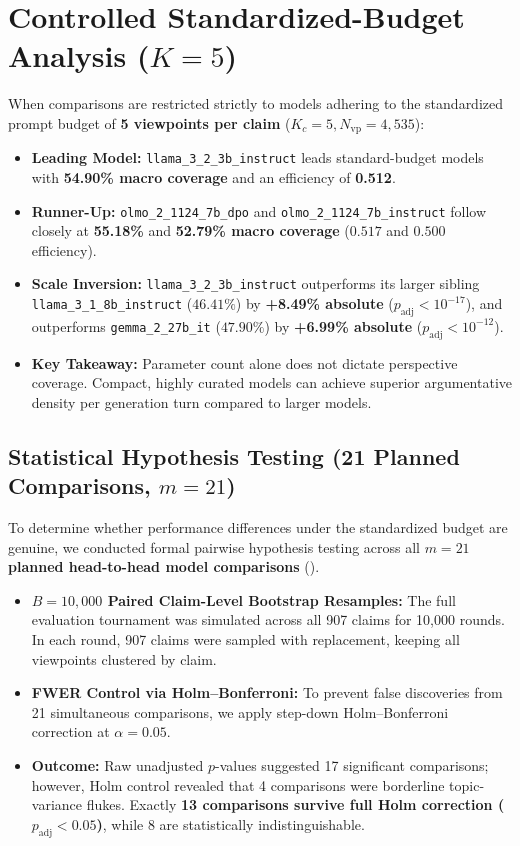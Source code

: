 \documentclass[11pt,a4paper]{article}
\begin{document}
\section{Controlled Standardized-Budget Analysis ($K = 5$)}
\label{sec:controlled_budget}

When comparisons are restricted strictly to models adhering to the standardized prompt budget of \textbf{5 viewpoints per claim} ($K_c = 5, N_{\text{vp}} = 4,535$):
\begin{itemize}[leftmargin=*,itemsep=1pt]
    \item \textbf{Leading Model:} \texttt{llama\_3\_2\_3b\_instruct} leads standard-budget models with \textbf{54.90\% macro coverage} and an efficiency of \textbf{0.512}.
    \item \textbf{Runner-Up:} \texttt{olmo\_2\_1124\_7b\_dpo} and \texttt{olmo\_2\_1124\_7b\_instruct} follow closely at \textbf{55.18\%} and \textbf{52.79\% macro coverage} ($0.517$ and $0.500$ efficiency).
    \item \textbf{Scale Inversion:} \texttt{llama\_3\_2\_3b\_instruct} outperforms its larger sibling \texttt{llama\_3\_1\_8b\_instruct} ($46.41\%$) by \textbf{+8.49\% absolute} ($p_{\text{adj}} < 10^{-17}$), and outperforms \texttt{gemma\_2\_27b\_it} ($47.90\%$) by \textbf{+6.99\% absolute} ($p_{\text{adj}} < 10^{-12}$).
    \item \textbf{Key Takeaway:} Parameter count alone does not dictate perspective coverage. Compact, highly curated models can achieve superior argumentative density per generation turn compared to larger models.
\end{itemize}

\subsection{Statistical Hypothesis Testing (21 Planned Comparisons, $m=21$)}
To determine whether performance differences under the standardized budget are genuine, we conducted formal pairwise hypothesis testing across all \textbf{$m = 21$ planned head-to-head model comparisons} ().
\begin{itemize}[leftmargin=*,itemsep=1pt]
    \item \textbf{$B = 10,000$ Paired Claim-Level Bootstrap Resamples:} The full evaluation tournament was simulated across all 907 claims for 10,000 rounds. In each round, 907 claims were sampled with replacement, keeping all viewpoints clustered by claim.
    \item \textbf{FWER Control via Holm--Bonferroni:} To prevent false discoveries from 21 simultaneous comparisons, we apply step-down Holm--Bonferroni correction at $\alpha = 0.05$.
    \item \textbf{Outcome:} Raw unadjusted $p$-values suggested 17 significant comparisons; however, Holm control revealed that 4 comparisons were borderline topic-variance flukes. Exactly \textbf{13 comparisons survive full Holm correction ($p_{\text{adj}} < 0.05$)}, while 8 are statistically indistinguishable.
\end{itemize}
\end{document}
